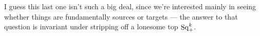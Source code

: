 \documentclass[10pt]{article}
\newcommand{\SqShift}{\Sq_{\smash{+}}}
\newcommand{\Sq}{\mathrm{Sq}}
\begin{document}
\begin{conjectured differentials}
I guess this last one isn't such a big deal, since we're interested mainly in seeing whether things are fundamentally sources or targets --- the answer to that question is invariant under stripping off a lonesome top $\SqShift^{k}$.
%


\end{conjectured differentials}
\end{document}
